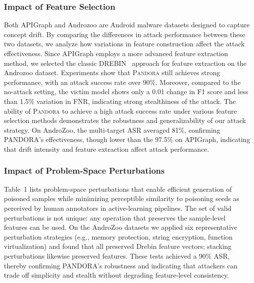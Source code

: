 \documentclass[lettersize,journal]{IEEEtran}
\newcommand{\pandora}{{\scshape Pandora}\xspace}
\begin{document}
\subsubsection{Impact of Feature Selection}
\label{Impact of Feature Selection}
Both APIGraph and Androzoo are Android malware datasets designed to capture concept drift. By comparing the differences in attack performance between these two datasets, we analyze how variations in feature construction affect the attack effectiveness.
Since APIGraph employs a more advanced feature extraction method, we selected the classic DREBIN~\cite{2014-NDSS-drebin} approach for feature extraction on the Androzoo dataset.
Experiments show that \pandora still achieves strong performance, with an attack success rate over 90\%.
Moreover, compared to the no-attack setting, the victim model shows only a 0.01 change in F1 score and less than 1.5\% variation in FNR, indicating strong stealthiness of the attack.
The ability of \pandora to achieve a high attack success rate under various feature selection methods demonstrates the robustness and generalizability of our attack strategy.
On AndroZoo, the multi-target ASR averaged 81\%, confirming PANDORA’s effectiveness, though lower than the 97.5\% on APIGraph, indicating that drift intensity and feature extraction affect attack performance.

\subsubsection{Impact of Problem-Space Perturbations}
\label{Impact of Problem-Space Perturbationsn}
Table~1 lists problem-space perturbations that enable efficient generation of poisoned samples while minimizing perceptible similarity to poisoning seeds as perceived by human annotators in active-learning pipelines.
The set of valid perturbations is not unique: any operation that preserves the sample-level features can be used.  
On the AndroZoo datasets we applied six representative perturbation strategies (e.g., memory protection, string encryption, function virtualization) and found that all preserved Drebin feature vectors; stacking perturbations likewise preserved features.
These tests achieved a 90\% ASR, thereby confirming PANDORA’s robustness and indicating that attackers can trade off simplicity and stealth without degrading feature-level consistency.
\end{document}
